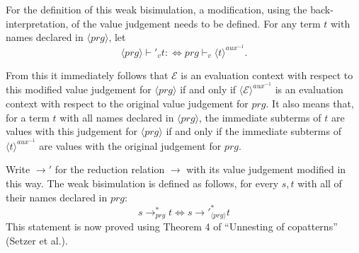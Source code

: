 For the definition of this weak bisimulation, a modification, using the back-interpretation, of the value judgement needs to be defined. For any term $t$ with names declared in $\langle prg \rangle$, let
\[
\langle prg \rangle \vdash'_v t :\iff prg \vdash_v \langle t \rangle^{aux^{-1}}.
\]

From this it immediately follows that $\mathcal{E}$ is an evaluation context with respect to this modified value judgement for $\langle prg \rangle$ if and only if $\langle \mathcal{E} \rangle^{aux^{-1}}$ is an evaluation context with respect to the original value judgement for $prg$. It also means that, for a term $t$ with all names declared in $\langle prg \rangle$, the immediate subterms of $t$ are values with this judgement for $\langle prg \rangle$ if and only if the immediate subterms of $\langle t \rangle^{aux^{-1}}$ are values with the original judgement for $prg$.

Write $\longrightarrow'$ for the reduction relation $\longrightarrow$ with its value judgement modified in this way. The weak bisimulation is defined as follows, for every $s,t$ with all of their names declared in $prg$:
\begin{equation}
s \longrightarrow_{prg}^* t \iff s {\longrightarrow'}_{\langle prg \rangle}^* t
\end{equation}
This statement is now proved using Theorem 4 of ``Unnesting of copatterns'' (Setzer et al.).


